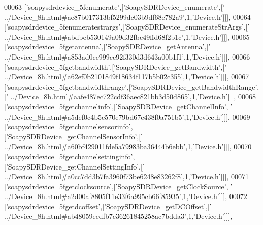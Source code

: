 \begin{DoxyCode}
00063   [\textcolor{stringliteral}{'soapysdrdevice\_5fenumerate'},[\textcolor{stringliteral}{'SoapySDRDevice\_enumerate'},[\textcolor{stringliteral}{'
      ../Device\_8h.html#ae87b017313bf5299dc03b9df68e782a9'},1,\textcolor{stringliteral}{'Device.h'}]]],
00064   [\textcolor{stringliteral}{'soapysdrdevice\_5fenumeratestrargs'},[\textcolor{stringliteral}{'SoapySDRDevice\_enumerateStrArgs'},[\textcolor{stringliteral}{'
      ../Device\_8h.html#abdbeb530149a09d32fbc49ffd68f2b1c'},1,\textcolor{stringliteral}{'Device.h'}]]],
00065   [\textcolor{stringliteral}{'soapysdrdevice\_5fgetantenna'},[\textcolor{stringliteral}{'SoapySDRDevice\_getAntenna'},[\textcolor{stringliteral}{'
      ../Device\_8h.html#a853ad0ce999cc92f330d3d643a00b1f1'},1,\textcolor{stringliteral}{'Device.h'}]]],
00066   [\textcolor{stringliteral}{'soapysdrdevice\_5fgetbandwidth'},[\textcolor{stringliteral}{'SoapySDRDevice\_getBandwidth'},[\textcolor{stringliteral}{'
      ../Device\_8h.html#a62ef0b2101849f18634f117b5b02c355'},1,\textcolor{stringliteral}{'Device.h'}]]],
00067   [\textcolor{stringliteral}{'soapysdrdevice\_5fgetbandwidthrange'},[\textcolor{stringliteral}{'SoapySDRDevice\_getBandwidthRange'},[\textcolor{stringliteral}{'
      ../Device\_8h.html#aafe487ec722cdf36aec821bb3d50d865'},1,\textcolor{stringliteral}{'Device.h'}]]],
00068   [\textcolor{stringliteral}{'soapysdrdevice\_5fgetchannelinfo'},[\textcolor{stringliteral}{'SoapySDRDevice\_getChannelInfo'},[\textcolor{stringliteral}{'
      ../Device\_8h.html#a5def0c4b5c570e79bd67c438f0a751b5'},1,\textcolor{stringliteral}{'Device.h'}]]],
00069   [\textcolor{stringliteral}{'soapysdrdevice\_5fgetchannelsensorinfo'},[\textcolor{stringliteral}{'SoapySDRDevice\_getChannelSensorInfo'},[\textcolor{stringliteral}{'
      ../Device\_8h.html#a60bf429011fde5a79983ba36444b6ebb'},1,\textcolor{stringliteral}{'Device.h'}]]],
00070   [\textcolor{stringliteral}{'soapysdrdevice\_5fgetchannelsettinginfo'},[\textcolor{stringliteral}{'SoapySDRDevice\_getChannelSettingInfo'},[\textcolor{stringliteral}{'
      ../Device\_8h.html#a0cc7dd3b7fa3960f73be6248e83262f8'},1,\textcolor{stringliteral}{'Device.h'}]]],
00071   [\textcolor{stringliteral}{'soapysdrdevice\_5fgetclocksource'},[\textcolor{stringliteral}{'SoapySDRDevice\_getClockSource'},[\textcolor{stringliteral}{'
      ../Device\_8h.html#a2d00af8805f11e33f6a995cb66f85935'},1,\textcolor{stringliteral}{'Device.h'}]]],
00072   [\textcolor{stringliteral}{'soapysdrdevice\_5fgetdcoffset'},[\textcolor{stringliteral}{'SoapySDRDevice\_getDCOffset'},[\textcolor{stringliteral}{'
      ../Device\_8h.html#ab48059eedfb7c36261845258ac7bdda3'},1,\textcolor{stringliteral}{'Device.h'}]]],

\end{DoxyCode}
